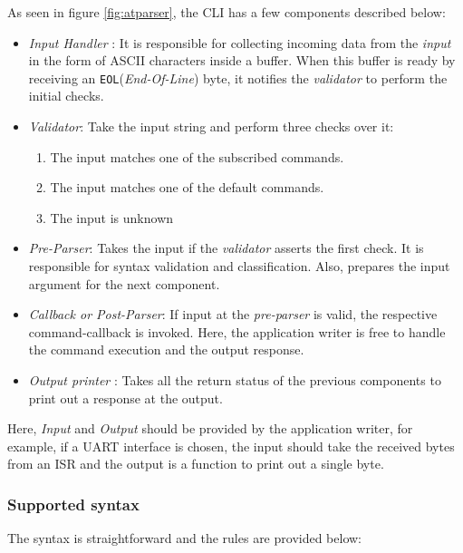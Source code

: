 As seen in figure \ref{fig:atparser}, the CLI has a few components described below:
\begin{itemize}
    \item  \textit{Input Handler} : It is responsible for collecting incoming data from the \textit{input} in the form of ASCII characters inside a buffer. When this buffer is ready by receiving an \lstinline{EOL}(\textit{End-Of-Line}) byte, it notifies the \textit{validator} to perform the initial checks.
    \item \textit{Validator}: Take the input string and perform three checks over it:
    \begin{enumerate}
        \item The input matches one of the subscribed commands.
        \item The input matches one of the default commands.
        \item The input is unknown
    \end{enumerate}
    \item \textit{Pre-Parser}: Takes the input if the \textit{validator} asserts the first check. It is responsible for syntax validation and classification. Also, prepares the input argument for the next component.
    \item \textit{Callback or Post-Parser}: If input at the \textit{pre-parser} is valid, the respective command-callback is invoked. Here, the application writer is free to handle the command execution and the output response.
    \item \textit{Output printer} : Takes all the return status of the previous components to print out a response at the output.
\end{itemize}
\bigskip

\begin{tcolorbox}
\HandRight Here, \textit{Input} and \textit{Output} should be provided by the application writer, for example, if a UART interface is chosen, the input should take the received bytes from an ISR and the output is a function to print out a single byte.
\end{tcolorbox}

\subsubsection{Supported syntax} \label{atsyntax}

The syntax is straightforward and the rules are provided below:

